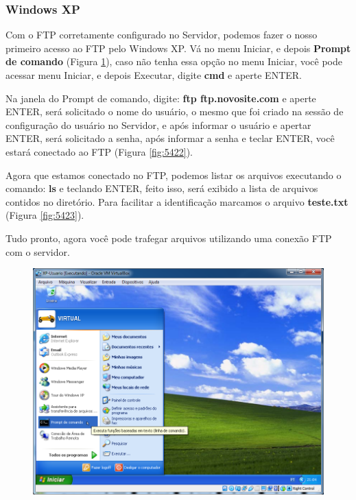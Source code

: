 \documentclass[10pt]{article}
\begin{document}
\subsubsection{Windows XP}
\par Com o FTP corretamente configurado no Servidor, podemos fazer o nosso primeiro acesso ao FTP pelo Windows XP. Vá no menu Iniciar, e depois \textbf{Prompt de comando} (Figura \ref{fig:5421}), caso não tenha essa opção no menu Iniciar, você pode acessar menu Iniciar, e depois Executar, digite \textbf{cmd} e aperte ENTER.
\par Na janela do Prompt de comando, digite: \textbf{ftp ftp.novosite.com} e aperte ENTER, será solicitado o nome do usuário, o mesmo que foi criado na sessão de configuração do usuário no Servidor, e após informar o usuário e apertar ENTER, será solicitado a senha, após informar a senha e teclar ENTER, você estará conectado ao FTP (Figura \ref{fig:5422}).
\par Agora que estamos conectado no FTP, podemos listar os arquivos executando o comando: \textbf{ls} e teclando ENTER, feito isso, será exibido a lista de arquivos contidos no diretório. Para facilitar a identificação marcamos o arquivo \textbf{teste.txt} (Figura \ref{fig:5423}).
\par Tudo pronto, agora você pode trafegar arquivos utilizando uma conexão FTP com o servidor.
\begin{figure}[H]
    \centering
    \caption{}
    \label{fig:5421}
    \includegraphics[width=\linewidth]{images/windows_server/ftp/028.png}
\end{figure}
\end{document}

